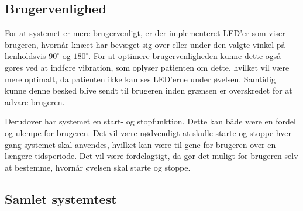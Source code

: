 \subsection{Brugervenlighed}
For at systemet er mere brugervenligt, er der implementeret LED'er som viser brugeren, hvornår knæet har bevæget sig over eller under den valgte vinkel på henholdsvis $90^{\circ}$ og $180^{\circ}$. For at optimere brugervenligheden kunne dette også gøres ved at indføre vibration, som oplyser patienten om dette, hvilket vil være mere optimalt, da patienten ikke kan ses LED'erne under øvelsen. Samtidig kunne denne besked blive sendt til brugeren inden grænsen er overskredet for at advare brugeren. 

Derudover har systemet en start- og stopfunktion. Dette kan både være en fordel og ulempe for brugeren. Det vil være nødvendigt at skulle starte og stoppe hver gang systemet skal anvendes, hvilket kan være til gene for brugeren over en længere tidsperiode. Det vil være fordelagtigt, da gør det muligt for brugeren selv at bestemme, hvornår øvelsen skal starte og stoppe.

\subsection{Samlet systemtest}